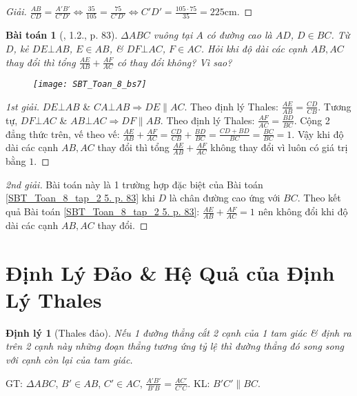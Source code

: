 \documentclass{article}
\newtheorem{baitoan}{Bài toán}
\newtheorem{dinhly}{Định lý}
\begin{document}
\begin{proof}[Giải]
	$\frac{AB}{CD} = \frac{A'B'}{C'D'}\Leftrightarrow\frac{35}{105} = \frac{75}{C'D'}\Leftrightarrow C'D' = \frac{105\cdot75}{35} = 225$cm.
\end{proof}

\begin{baitoan}[\cite{SBT_Toan_8_tap_2}, 1.2., p. 83]
	$\Delta ABC$ vuông tại $A$ có đường cao là $AD$, $D\in BC$. Từ $D$, kẻ $DE\bot AB$, $E\in AB$, \& $DF\bot AC$, $F\in AC$. Hỏi khi độ dài các cạnh $AB,AC$ thay đổi thì tổng $\frac{AE}{AB} + \frac{AF}{AC}$ có thay đổi không? Vì sao?
	\begin{figure}[H]
		\centering
		\texttt{[image: SBT\_Toan\_8\_bs7]}
	\end{figure}
\end{baitoan}

\begin{proof}[1st giải]	
	$DE\bot AB$ \& $CA\bot AB\Rightarrow DE\parallel AC$. Theo định lý Thales: $\frac{AE}{AB} = \frac{CD}{CB}$. Tương tự, $DF\bot AC$ \& $AB\bot AC\Rightarrow DF\parallel AB$. Theo định lý Thales: $\frac{AF}{AC} = \frac{BD}{BC}$. Cộng 2 đẳng thức trên, vế theo vế: $\frac{AE}{AB} + \frac{AF}{AC} = \frac{CD}{CB} + \frac{BD}{BC} = \frac{CD + BD}{BC} = \frac{BC}{BC} = 1$. Vậy khi độ dài các cạnh $AB,AC$ thay đổi thì tổng $\frac{AE}{AB} + \frac{AF}{AC}$ không thay đổi vì luôn có giá trị bằng $1$.
\end{proof}

\begin{proof}[2nd giải]
	Bài toán này là 1 trường hợp đặc biệt của Bài toán \ref{SBT_Toan_8_tap_2 5. p. 83} khi $D$ là chân đường cao ứng với $BC$. Theo kết quả Bài toán \ref{SBT_Toan_8_tap_2 5. p. 83}: $\frac{AE}{AB} + \frac{AF}{AC} = 1$ nên không đổi khi độ dài các cạnh $AB,AC$ thay đổi.
\end{proof}


\section{Định Lý Đảo \& Hệ Quả của Định Lý Thales}

\begin{dinhly}[Thales đảo]
	Nếu 1 đường thẳng cắt 2 cạnh của 1 tam giác \& định ra trên 2 cạnh này những đoạn thẳng tương ứng tỷ lệ thì đường thẳng đó song song với cạnh còn lại của tam giác.
\end{dinhly}
GT: $\Delta ABC$, $B'\in AB$, $C'\in AC$, $\frac{A'B'}{B'B} = \frac{AC'}{C'C}$. KL: $B'C'\parallel BC$.
\end{document}
